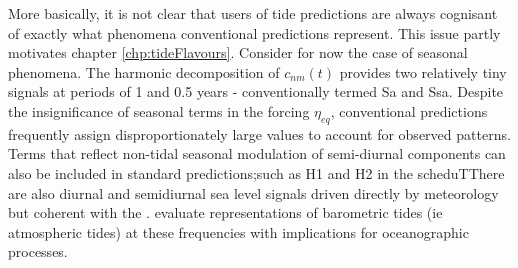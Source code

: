 More basically, it is not clear that users of tide predictions are always cognisant of exactly what phenomena conventional predictions represent.    This issue partly motivates chapter \ref{chp:tideFlavours}.
Consider for now the case of seasonal phenomena.   The harmonic decomposition of $c_{nm}(t)$ provides two relatively tiny signals at periods of 1 and 0.5 years - conventionally termed Sa and Ssa.  Despite the insignificance of seasonal terms in the forcing $\eta_{eq}$, conventional predictions frequently assign  disproportionately large values to account for observed patterns.  
Terms that reflect non-tidal seasonal modulation of semi-diurnal components can also be included in standard predictions;such as H1 and H2 in the \citet{Foreman:1977ua} scheduTThere are also  diurnal and semidiurnal sea level signals driven directly by meteorology  but coherent with the \ATGP{}. \citet{Ray:2003ui} evaluate \NWP{} representations of barometric tides (ie atmospheric tides) at these frequencies with implications for oceanographic processes.  


